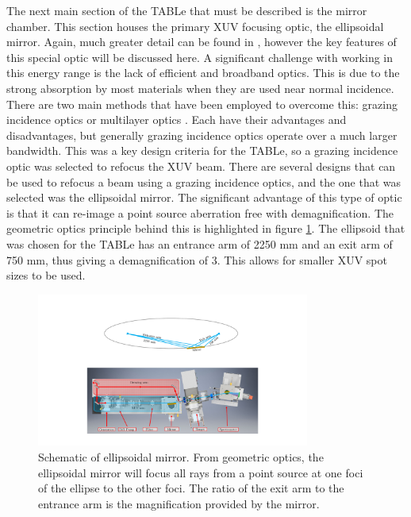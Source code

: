 The next main section of the TABLe that must be described is the mirror chamber.  This section houses the primary XUV focusing optic, the ellipsoidal mirror.  Again, much greater detail can be found in \cite{smithApplicationAttosecondTechniques2020}, however the key features of this special optic will be discussed here.  A significant challenge with working in this energy range is the lack of efficient and broadband optics.  This is due to the strong absorption by most materials when they are used near normal incidence.  There are two main methods that have been employed to overcome this: grazing incidence optics or multilayer optics \cite{attwoodSoftXraysExtreme2000}.  Each have their advantages and disadvantages, but generally grazing incidence optics operate over a much larger bandwidth.  This was a key design criteria for the TABLe, so a grazing incidence optic was selected to refocus the XUV beam.  There are several designs that can be used to refocus a beam using a grazing incidence optics, and the one that was selected was the ellipsoidal mirror.  The significant advantage of this type of optic is that it can re-image a point source aberration free with demagnification.  The geometric optics principle behind this is highlighted in figure \ref{fig:ellipsoid}.  The ellipsoid that was chosen for the TABLe has an entrance arm of 2250 mm and an exit arm of 750 mm, thus giving a demagnification of 3.  This allows for smaller XUV spot sizes to be used.
\begin{figure}
	\centering
	\includegraphics[width=0.8\textwidth]{figures/Beamline/ellipsoid.pdf}
	\caption[Schematic of ellipsoidal mirror]{Schematic of ellipsoidal mirror.  From geometric optics, the ellipsoidal mirror will focus all rays from a point source at one foci of the ellipse to the other foci.  The ratio of the exit arm to the entrance arm is the magnification provided by the mirror.}
	\label{fig:ellipsoid}
\end{figure}

